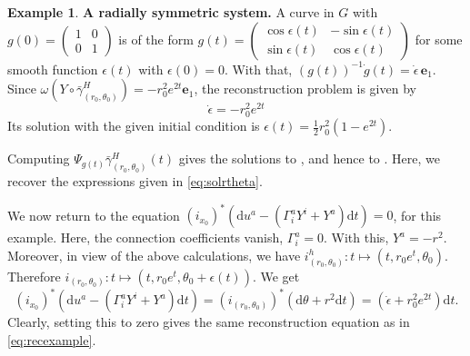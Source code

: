 \documentclass[11pt]{article}
\theoremstyle{plain}
\theoremstyle{definition}
\newtheorem{example}{Example}
\begin{document}
\begin{example} {\bf A radially symmetric system.}
A curve in $G$ with $g(0)=\begin{pmatrix} 1 & 0 \\ 0 & 1 \end{pmatrix}$ is of the form $g(t)=\begin{pmatrix} \cos \epsilon(t) & -\sin \epsilon(t) \\ \sin \epsilon(t) & \cos \epsilon (t) \end{pmatrix}$ for some smooth function $\epsilon(t)$ with $\epsilon(0)=0$. With that, $(g(t))^{-1}\dot{g}(t)=\dot{\epsilon}\, \mathbf{e}_1$.  Since $\omega(Y\circ \bar{\gamma}^H_{(r_0,\theta_0)})=-r_0^2e^{2t} \mathbf{e}_1$, the reconstruction problem is given by 
\begin{equation}\label{eq:recexample}\dot{\epsilon}=-r_0^2e^{2t}
\end{equation}
Its solution with the given initial condition is $\epsilon(t)=\frac{1}{2}r_0^2(1-e^{2t})$. 

Computing $\Psi_{g(t)} \bar{\gamma}_{(r_0,\theta_0)}^H(t)$ gives the solutions to , and hence to . Here, we recover the expressions given in \eqref{eq:solrtheta}. 






We now return to the equation $(i_{x_0})^{\ast}({\mathrm d}u^a - ( \Gamma^a_iY^i + Y^a){\mathrm d}t)=0$, for this example. Here, the connection coefficients vanish, $\Gamma^a_i=0$. With this, $Y^a = -r^2$. Moreover, in view of the above calculations, we have $i^h_{(r_0,\theta_0)}\colon t \mapsto(t,r_0e^t,\theta_0)$. Therefore $i_{(r_0,\theta_0)}\colon t \mapsto(t,r_0e^t,\theta_0+\epsilon(t))$. We get
\begin{equation*}
    (i_{x_0})^{\ast}({\mathrm d}u^a - ( \Gamma^a_iY^i + Y^a){\mathrm d}t)= (i_{(r_0,\theta_0)})^{\ast}({\mathrm d}\theta  +r^2{\mathrm d}t) = ({\dot\epsilon}+
 r_0^2e^{2t}){\mathrm d}t.
\end{equation*}
Clearly, setting this to zero gives the same reconstruction equation as in \eqref{eq:recexample}.





 





\end{example}
\end{document}
